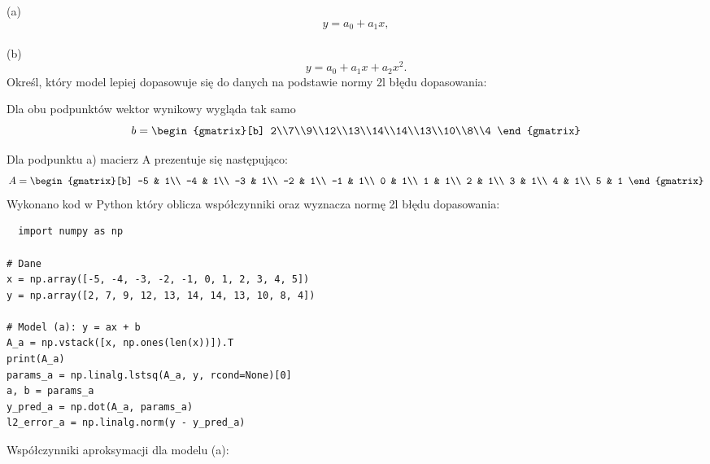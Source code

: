 \documentclass{article}
\begin{document}
(a)
  \begin{equation}
y = a_0 + a_1x ,
\end{equation}\\

(b)
\begin{equation}
  y=a_0+a_1x+a_2x^2.
\end{equation}
Określ, który model lepiej dopasowuje się do danych na podstawie normy 2l błędu dopasowania:

Dla obu podpunktów wektor wynikowy wygląda tak samo
\begin{equation}
  b=
  \begin{gmatrix}[b]
  2\\7\\9\\12\\13\\14\\14\\13\\10\\8\\4  
  \end{gmatrix}
\end{equation}

Dla podpunktu a) macierz A prezentuje się następująco:
\begin{equation}
  A=
  \begin{gmatrix}[b]
    -5 & 1\\
    -4 & 1\\
    -3 & 1\\
    -2 & 1\\
    -1 & 1\\
    0 & 1\\
    1 & 1\\
    2 & 1\\
    3 & 1\\
    4 & 1\\
    5 & 1
  \end{gmatrix}
\end{equation}
Wykonano kod w Python który oblicza współczynniki oraz wyznacza normę 2l błędu dopasowania:
\begin{lstlisting}
  import numpy as np

# Dane
x = np.array([-5, -4, -3, -2, -1, 0, 1, 2, 3, 4, 5])
y = np.array([2, 7, 9, 12, 13, 14, 14, 13, 10, 8, 4])

# Model (a): y = ax + b
A_a = np.vstack([x, np.ones(len(x))]).T
print(A_a)
params_a = np.linalg.lstsq(A_a, y, rcond=None)[0]
a, b = params_a
y_pred_a = np.dot(A_a, params_a)
l2_error_a = np.linalg.norm(y - y_pred_a)
\end{lstlisting}
Współczynniki aproksymacji dla modelu (a):
\end{document}
